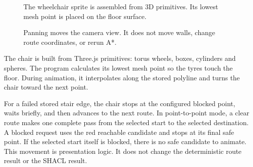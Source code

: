 \documentclass[11pt,a4paper]{article}
\newcommand{\stage}[1]{\par\vspace{3pt}{\color{darkteal}\bfseries\large #1}\par}
\newcommand{\wheelchair}[2]{\begin{scope}[shift={(#1,#2)}]\draw[ink,line width=1.2pt] (-.25,-.18) circle (.18);\draw[ink,line width=1pt] (.26,-.2) circle (.09);\fill[blue!65!black] (-.15,.03) rectangle (.25,.25);\fill[purple!70] (-.08,.25) rectangle (.14,.47);\fill[orange!50] (.03,.58) circle (.12);\end{scope}}
\begin{document}
\begin{figure}[H]\centering
{}
\caption{The wheelchair sprite is assembled from 3D primitives. Its lowest mesh point is placed on the floor surface.}
\end{figure}

\begin{figure}[H]\centering
{}
\caption{Panning moves the camera view. It does not move walls, change route coordinates, or rerun A*.}
\end{figure}

\stage{Animation}
The chair is built from Three.js primitives: torus wheels, boxes, cylinders and spheres. The program calculates its lowest mesh point so the tyres touch the floor. During animation, it interpolates along the stored polyline and turns the chair toward the next point.

For a failed stored stair edge, the chair stops at the configured blocked point, waits briefly, and then advances to the next route. In point-to-point mode, a clear route makes one complete pass from the selected start to the selected destination. A blocked request uses the red reachable candidate and stops at its final safe point. If the selected start itself is blocked, there is no safe candidate to animate. This movement is presentation logic. It does not change the deterministic route result or the SHACL result.
\end{document}
